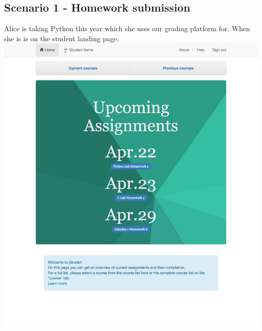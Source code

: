 \subsection{Scenario 1 - Homework submission}

Alice is taking Python this year which she uses our grading platform for. When she is is on the student landing page.\\
\includegraphics[width=\textwidth]{screenshots/StudentLandingPage.png}\\

